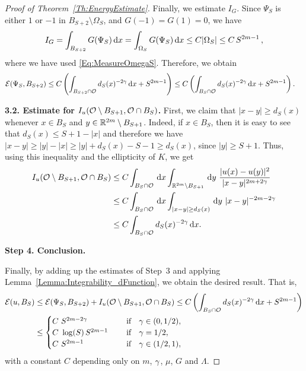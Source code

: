 \begin{proof}[Proof of Theorem~\ref{Th:EnergyEstimate}]
Finally, we estimate $I_G$. Since $\Psi_S$ is either $1$ or $-1$ in $B_{S+2}\setminus \Omega_S$, and $G(-1)=G(1)=0$, we have
\begin{align*}
I_G = \int_{B_{S+2}} G(\Psi_S) \,\mathrm{d} x= \int_{\Omega_S} G(\Psi_S)\,\mathrm{d} x \leq C | \Omega_S| \leq C\,S^{2m-1}\,,
\end{align*}
where we have used \eqref{Eq:MeasureOmegaS}. Therefore, we obtain
\begin{align*}
\mathcal{E}(\Psi_S,B_{S+2}) &\leq C \left(\int_{B_{S+2} \cap \mathcal{O}} d_S(x)^{-2\gamma} \,\mathrm{d} x + S^{2m-1} \right)\leq C\left(\int_{B_{S} \cap \mathcal{O}} d_S(x)^{-2\gamma} \,\mathrm{d} x + S^{2m-1} \right).
\end{align*}


\textbf{3.2. Estimate for $I_u(\mathcal{O} \setminus B_{S+1}, \mathcal{O} \cap B_S)$.} First, we claim that $|x-y|\geq d_S(x)$ whenever $x\in B_S$ and $y\in \mathbb{R}^{2m}\setminus B_{S+1}$. Indeed, if $x\in B_S$, then it is easy to see that $d_S(x) \leq S+1-|x|$ and therefore we have $|x-y|\geq |y|-|x|\geq |y|+d_S(x)-S-1 \geq  d_S(x)$, since $|y| \geq S+1$. Thus, using this inequality and the ellipticity of $K$, we get
\begin{align*}
I_u(\ocal \setminus B_{S+1}, \ocal \cap B_S) &\leq C \int_{B_S \cap \ocal} \d x \int_{\R^{2m}\setminus B_{S+1}} \d y \ \frac{|u(x)-u(y)|^2}{|x-y|^{2m+2\s}} \\
& \leq C \int_{B_S \cap \ocal} \d x \int_{|x-y|\geq d_S(x)} \d y \ |x-y|^{-2m-2\s} \\
&\leq C \int_{B_S \cap \ocal} d_S(x)^{-2\s} \d x.
\end{align*}

\textbf{Step 4. Conclusion.}

Finally, by adding up the estimates of Step~3 and applying Lemma~\ref{Lemma:Integrability_dFunction}, we obtain the desired result. That is,
\begin{align*}
\mathcal{E}(u,B_S) &\leq \mathcal{E}(\Psi_S,B_{S+2}) + I_u(\mathcal{O} \setminus B_{S+1}, \mathcal{O} \cap B_S) \leq C\left(\int_{B_S \cap \mathcal{O}} d_S(x)^{-2\gamma} \,\mathrm{d} x + S^{2m-1} \right)\\
&\leq \begin{cases}
C \ S^{2m-2\gamma}\ \ \ &\textrm{if } \ \ \gamma\in(0,1/2),\\
C\ \log(S)\,S^{2m-1}\ \ \ \ &\textrm{if } \ \ \gamma=1/2,\\
C \ S^{2m-1}\ \ \ \ &\textrm{if } \ \ \gamma\in(1/2,1),\\
\end{cases}
\end{align*}
with a constant $C$ depending only on $m$, $\gamma$, $\mu$, $G$ and $\Lambda$. 


\end{proof}
